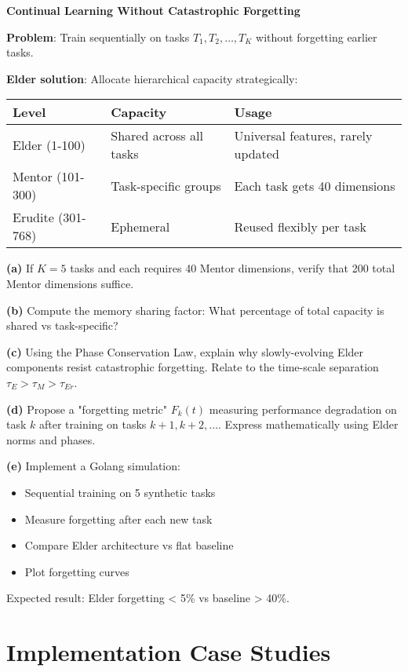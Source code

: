 \begin{application}
\textbf{Continual Learning Without Catastrophic Forgetting}

\textbf{Problem}: Train sequentially on tasks $T_1, T_2, \ldots, T_K$ without forgetting earlier tasks.

\textbf{Elder solution}: Allocate hierarchical capacity strategically:

\begin{center}
\begin{tabular}{|l|l|l|}
\hline
Level & Capacity & Usage \\
\hline
Elder (1-100) & Shared across all tasks & Universal features, rarely updated \\
Mentor (101-300) & Task-specific groups & Each task gets 40 dimensions \\
Erudite (301-768) & Ephemeral & Reused flexibly per task \\
\hline
\end{tabular}
\end{center}

\textbf{(a)} If $K=5$ tasks and each requires 40 Mentor dimensions, verify that 200 total Mentor dimensions suffice.

\textbf{(b)} Compute the memory sharing factor: What percentage of total capacity is shared vs task-specific?

\textbf{(c)} Using the Phase Conservation Law, explain why slowly-evolving Elder components resist catastrophic forgetting. Relate to the time-scale separation $\tau_E > \tau_M > \tau_{Er}$.

\textbf{(d)} Propose a "forgetting metric" $F_k(t)$ measuring performance degradation on task $k$ after training on tasks $k+1, k+2, \ldots$. Express mathematically using Elder norms and phases.

\textbf{(e)} Implement a Golang simulation:
\begin{itemize}
\item Sequential training on 5 synthetic tasks
\item Measure forgetting after each new task
\item Compare Elder architecture vs flat baseline
\item Plot forgetting curves
\end{itemize}

Expected result: Elder forgetting < 5\% vs baseline > 40\%.
\end{application}

\section{Implementation Case Studies}

